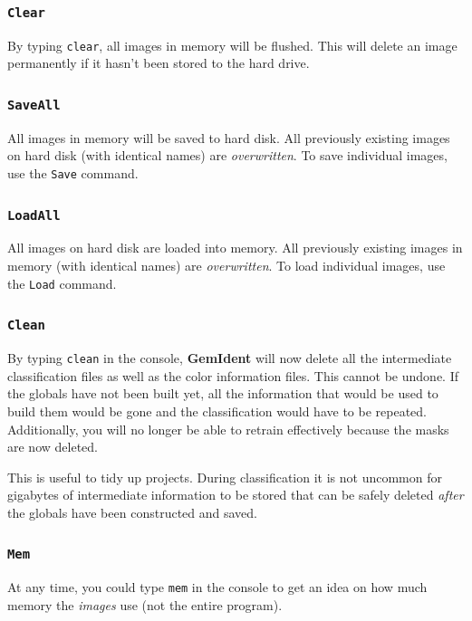 \documentclass[12pt]{article}
\begin{document}
\subsubsection{\tt Clear}

By typing {\tt clear}, all images in memory will be flushed. This will delete an image permanently if it hasn't been stored to the hard drive.

\subsubsection{\tt SaveAll}

All images in memory will be saved to hard disk. All previously existing images on hard disk (with identical names) are {\emph{overwritten}}. To save individual images, use the {\tt Save} command.

\subsubsection{\tt LoadAll}

All images on hard disk are loaded into memory. All previously existing images in memory (with identical names) are {\emph{overwritten}}. To load individual images, use the {\tt Load} command.

\subsubsection{\tt Clean}

By typing {\tt clean} in the console, {\bf GemIdent} will now delete all the intermediate classification files as well as the color information files. This cannot be undone. If the globals have not been built yet, all the information that would be used to build them would be gone and the classification would have to be repeated. Additionally, you will no longer be able to retrain effectively because the masks are now deleted. 

This is useful to tidy up projects. During classification it is not uncommon for gigabytes of intermediate information to be stored that can be safely deleted {\emph{after}} the globals have been constructed and saved.

\subsubsection{\tt Mem}

At any time, you could type {\tt mem} in the console to get an idea on how much memory the {\emph{images}} use (not the entire program).
\end{document}
